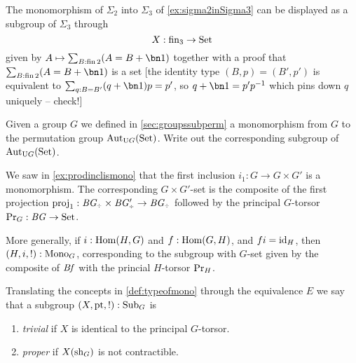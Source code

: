 %
  \begin{example}
    The monomorphism of $\Sigma_2$ into $\Sigma_3$ of \cref{ex:sigma2inSigma3} can be displayed as a subgroup of $\Sigma_3$ through
    $$X:\fin_3\to\Set
    $$
    given by $A\mapsto\sum_{B:\fin 2}(A=B+\bn 1)$ together with a proof that $\sum_{B:\fin 2}(A=B+\bn 1)$ is a set [the identity type $(B,p)=(B',p')$ is equivalent to $\sum_{q:B=B'}(q+\bn 1)p=p'$, so $q+\bn 1=p'p^{-1}$ which pins down $q$ uniquely  -- check!]
  \end{example}
  \begin{xca}
    Given a group $G$ we defined in \cref{sec:groupssubperm} a monomorphism from $G$ to the permutation group $\aut_{\USym G}(\Set)$. Write out the corresponding subgroup of $\aut_{\USym G}(\Set)$.
  \end{xca}
\begin{example}
  \label{ex:prodinclisGset}
  We saw in \cref{ex:prodinclismono} that the first inclusion $i_1:G\to G\times G'$ is a monomorphism.
  The corresponding $G\times G'$-set is the composite of the first projection $\mathrm{proj}_1:\BG_\div\times\BG'_\div\to \BG_\div$ followed by the principal $G$-torsor $\mathrm{Pr}_{{G}}:\mathit{B}\mathit{G}\to\mathrm{Set}$.

  More generally, if $i:\Hom(H,G)$ and $f:\Hom(G,H)$, and $fi=\mathord{\mathrm{id}}_H$, then $(H,i,!):\mathrm{Mono}_G$, corresponding to the subgroup with $G$-set given by the composite of $\mathit{B}\mathit{f}$ with the princial $H$-torsor $\mathrm{Pr}_{{H}}$.
\end{example}



  Translating the concepts in \cref{def:typeofmono} through the equivalence $E$ we say that a subgroup $(X,\mathrm{pt},!):\mathrm{Sub}_G$ is
      \begin{enumerate}
      \item \emph{trivial} if $X$ is identical to the principal $G$-torsor.
      \item \emph{proper} if $X(\mathrm{sh}_G)$ is not contractible.
      \end{enumerate}

